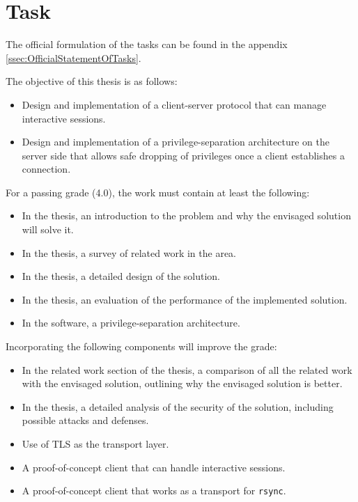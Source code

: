 \documentclass[10pt,a4paper,titlepage,twoside,english,final]{zhawreprt}
\begin{document}
\section{Task}\label{sec:Task}
The official formulation of the tasks can be found in the appendix \ref{ssec:OfficialStatementOfTasks}.

The objective of this thesis is as follows:
\begin{itemize}
\item Design and implementation of a client-server protocol that can manage interactive sessions.
\item Design and implementation of a privilege-separation architecture on the server side that allows safe dropping of privileges once a client establishes a connection.
\end{itemize}

For a passing grade (4.0), the work must contain at least the following:
\begin{itemize}
\item In the thesis, an introduction to the problem and why the envisaged solution will solve it.
\item In the thesis, a survey of related work in the area.
\item In the thesis, a detailed design of the solution.
\item In the thesis, an evaluation of the performance of the implemented solution.
\item In the software, a privilege-separation architecture.
\end{itemize}

Incorporating the following components will improve the grade:
\begin{itemize}
\item In the related work section of the thesis, a comparison of all the related work with the envisaged solution, outlining why the envisaged solution is better.
\item In the thesis, a detailed analysis of the security of the solution, including possible attacks and defenses.
\item Use of \gls{TLS} as the transport layer.
\item A proof-of-concept client that can handle interactive sessions.
\item A proof-of-concept client that works as a transport for \texttt{rsync}.
\end{itemize}
\end{document}
